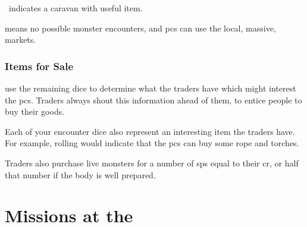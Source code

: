 \begin{multicols}{2}
\begin{dlist}
  \item
  \encCivilization\ indicates a caravan with  useful item.

  \item
  \encCivilization means no possible monster encounters, and \glspl{pc} can use the local, massive, markets.
\end{dlist}

\subsubsection{Items for Sale}
\label{traders}
use the remaining dice to determine what the traders have which might interest the \glspl{pc}.
Traders always shout this information ahead of them, to entice people to buy their goods.

\encTraders

Each of your encounter dice also represent an interesting item the traders have.
For example, rolling  would indicate that the \glspl{pc} can buy some rope and torches.

Traders also purchase live \glspl{monster} for a number of \glspl{sp} equal to their \gls{cr}, or half that number if the body is well prepared.


\end{multicols}

\setCycle{\month}{\day}

\section{Missions at the }
\label{NGmissions}

